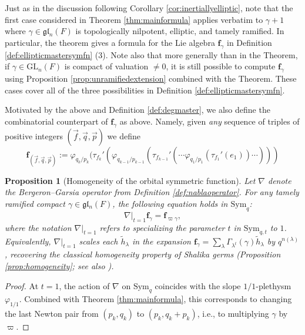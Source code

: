 \documentclass{amsart}
\numberwithin{equation}{section}
\newtheorem{proposition}[lemma]{Proposition}%
\theoremstyle{definition}
\def\tilde{\widetilde}
\def\GL{{\mathrm{GL}}}
\def\Sym{{\mathrm{Sym}}}
\renewcommand{\th}{\tilde{h}}
\newcommand{\fgamma}{\mathbf{f}_{\gamma}}
\newcommand{\fl}{\mathfrak{l}}
\newcommand{\fg}{\mathfrak{g}}
\begin{document}
Just as in the discussion following Corollary \ref{cor:inertiallyelliptic}, note that the first case considered in Theorem \ref{thm:mainformula} applies verbatim to $\gamma+1$ where $\gamma\in \fg\fl_n(F)$  is topologically nilpotent, elliptic, and tamely ramified. In particular, the theorem gives a formula for the Lie algebra $\fgamma$ in Definition \ref{def:ellipticmastersymfn} (3). Note also that more generally than in the Theorem, if $\gamma\in \GL_n(F)$ is compact of valuation $\neq 0$, it is still possible to compute $\fgamma$ using Proposition \ref{prop:unramifiedextension} combined with the Theorem. These cases cover all of the three possibilities in Definition \ref{def:ellipticmastersymfn}.

Motivated by the above and Definition \ref{def:degmaster}, we also define the combinatorial counterpart of $\fgamma$ as above. Namely, given {\em any} sequence of triples of positive integers $(\vec{f},\vec{q},\vec{p})$ we define
\begin{equation}
\label{eq:degenerate_combcounterpart}
    \mathbf{f}_{(\vec{f},\vec{q},\vec{p})}:=\varphi_{q_k/p_k}(\tau_{f_k}'(\varphi_{q_{k-1}/p_{k-1}}(\tau_{f_{k-1}}'(\cdots \varphi_{q_1/p_1}(\tau_{f_1}'(e_1))\cdots)))
\end{equation}

\begin{proposition}[Homogeneity of the orbital symmetric function]\label{prop:homog-orbital}
Let $\nabla$ denote the Bergeron--Garsia operator from Definition \ref{def:nablaoperator}. For any tamely ramified compact $\gamma \in \fg\fl_n(F)$, the following equation holds in $\Sym_q$:
\begin{equation}
\label{eq:homogeneity}
\nabla|_{t=1}\fgamma=\mathbf{f}_{\varpi\gamma},
\end{equation}
where the notation $\nabla|_{t=1}$ refers to specializing the parameter $t$ in $\Sym_{q,t}$ to $1$. Equivalently, $\nabla|_{t=1}$ scales each $\th_\lambda$ in the expansion $\fgamma=\sum_\lambda \Gamma_{\lambda^t}(\gamma)\th_\lambda$ by $q^{n(\lambda)}$, recovering the classical homogeneity property of Shalika germs (Proposition \ref{prop:homogeneity}; see also \cite[Lemme 1.2.]{W1}).
\end{proposition}
\begin{proof}
At $t=1$, the action of $\nabla$ on $\Sym_q$ coincides with the slope $1/1$-plethysm $\varphi_{1/1}$. Combined with Theorem \ref{thm:mainformula}, this corresponds to changing the last Newton pair from $(p_k, q_k)$ to $(p_k, q_k+p_k)$, i.e., to multiplying $\gamma$ by $\varpi$.
\end{proof}
\end{document}
